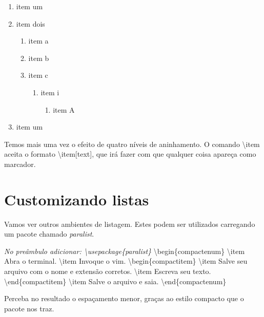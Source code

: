 \noindent\begin{enumerate}
\item item um
\item item dois
\begin{enumerate}
\item item a
\item item b
\item item c
\begin{enumerate}
\item item i
\begin{enumerate}
\item item A
\end{enumerate}
\end{enumerate}
\end{enumerate}
\item item um
\end{enumerate}

Temos mais uma vez o efeito de quatro níveis de aninhamento.
O comando \textbackslash item aceita o formato \textbackslash item[text], que
irá fazer com que qualquer coisa apareça como marcador.

\section{Customizando listas}
Vamos ver outros ambientes de listagem.
Estes podem ser utilizados carregando um pacote chamado \emph{paralist}.

\noindent \emph{No preâmbulo adicionar:\newline
\noindent\textbackslash usepackage\{paralist\}\newline}
\textbackslash begin\{compactenum\}\newline
\textbackslash item Abra o terminal.\newline
\textbackslash item Invoque o vim.\newline
\textbackslash begin\{compactitem\}\newline
\textbackslash item Salve seu arquivo com o nome e extensão corretos.\newline
\textbackslash item Escreva seu texto.\newline
\textbackslash end\{compactitem\}\newline
\textbackslash item Salve o arquivo e saia.\newline
\textbackslash end\{compactenum\}\newline

Perceba no resultado o espaçamento menor, graças ao estilo compacto que o
pacote nos traz.

